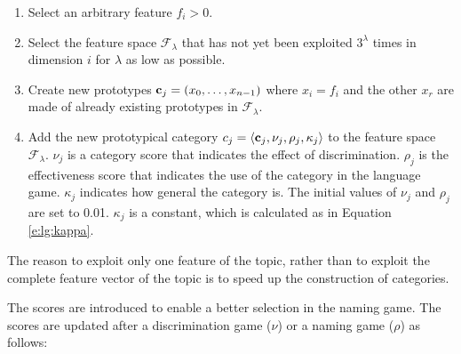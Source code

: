 \begin{enumerate}

\item Select an arbitrary feature $f_i>0$.

\item Select the feature space ${\mathcal F}_\lambda$ that has not yet been exploited $3^\lambda$ times in dimension $i$ for $\lambda$ as low as possible.

\item Create new prototypes ${\bf c}_j = (x_0,\ldots,x_{n-1})$ where $x_i=f_i$ and the other $x_r$ are made of already existing prototypes in ${\mathcal F}_\lambda$.

\item Add the new prototypical category $c_j=\langle {\bf c}_j,\nu_j,\rho_j,\kappa_j \rangle$ to the feature space ${\mathcal F}_\lambda$. $\nu_j$ is a category score that indicates the effect of discrimination. $\rho_j$ is the effectiveness score that indicates the use of the category in the language game. $\kappa_j$ indicates how general the category is. The initial values of $\nu_j$ and $\rho_j$ are set to 0.01. $\kappa_j$ is a constant, which is calculated as in Equation \ref{e:lg:kappa}. 

\end{enumerate}


The reason to exploit only one feature of the topic, rather than to exploit the complete feature vector of the topic is to speed up the construction of categories. 

The scores are introduced to enable a better selection in the naming game. The scores are updated after a discrimination game ($\nu$) or a naming game ($\rho$) as follows:


